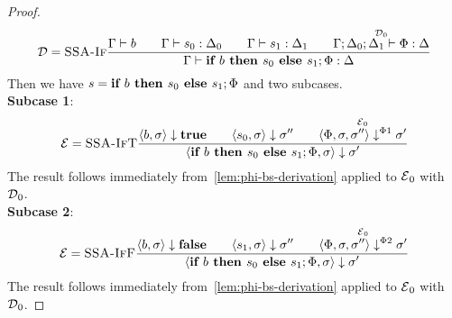 \begin{proof}
\begin{align*}
        \D = \rule{SSA-If}{\typestmt{\Gamma}{b}\qquad
        \typestep{\Gamma}{s_0}{\Delta_0}\qquad \typestep{\Gamma}{s_1}{\Delta_1}\qquad
        \overset{\D_0}{\typestep{\Gamma;\Delta_0;\Delta_1}{\philist}{\Delta}}}
        {\typestep{\Gamma}{\defaultssaif}{\Delta}}
    \end{align*}
    Then we have $s = \defaultssaif$ and
    two subcases.\\
    \textbf{Subcase 1}:
    \begin{align*}
        \E = \rule{SSA-IfT}{\bigstep{b}{\store}{\btrue}\qquad \bigstep{s_0}{\store}{\store''}
        \qquad \overset{\E_0}{\bigsteppl{\philist}{\store}{\sigma''}{\sigma'}}}
        {\bigstep{\defaultssaif}{\store}{\store'}}
    \end{align*}
    The result follows immediately from~\autoref{lem:phi-bs-derivation} applied to $\E_0$ with $\D_0$.\\
    \textbf{Subcase 2}:
    \begin{align*}
        \E = \rule{SSA-IfF}{\bigstep{b}{\store}{\bfalse}\qquad \bigstep{s_1}{\store}{\store''}
        \qquad \overset{\E_0}{\bigsteppr{\philist}{\store}{\sigma''}{\sigma'}}}
        {\bigstep{\defaultssaif}{\store}{\store'}}
    \end{align*}
    The result follows immediately from~\autoref{lem:phi-bs-derivation} applied to $\E_0$ with $\D_0$.
\end{proof}
\fi
